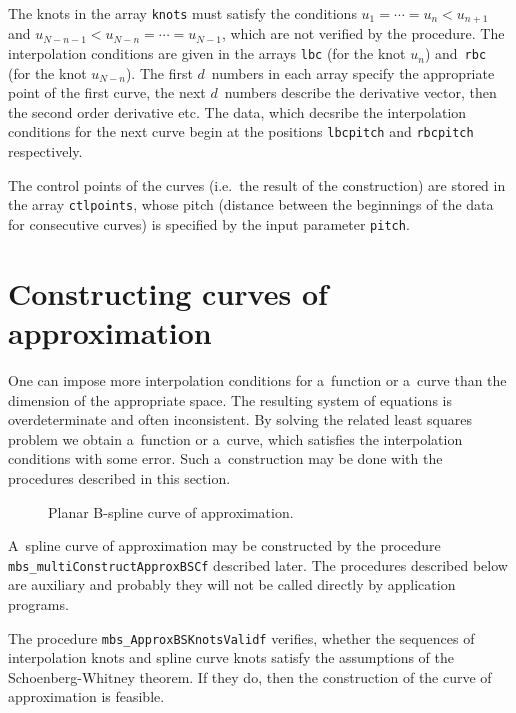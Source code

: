 The knots in the array \texttt{knots} must satisfy the conditions
$u_1=\cdots=u_n<u_{n+1}$ and $u_{N-n-1}<u_{N-n}=\cdots=u_{N-1}$,
which are not verified by the procedure. The interpolation conditions
are given in the arrays \texttt{lbc} (for the knot $u_n$) and~\texttt{rbc}
(for the knot $u_{N-n}$). The first $d$~numbers in each array specify
the appropriate point of the first curve, the next $d$~numbers describe the
derivative vector, then the second order derivative etc.
The data, which decsribe the interpolation conditions for the next curve
begin at the positions \texttt{lbcpitch} and \texttt{rbcpitch} respectively.

The control points of the curves (i.e.\ the result of the construction)
are stored in the array \texttt{ctlpoints}, whose pitch
(distance between the beginnings of the data for consecutive curves)
is specified by the input parameter \texttt{pitch}.


\newpage
\section{Constructing curves of approximation}

\begin{sloppypar}
One can impose more interpolation conditions for a~function or a~curve
than the dimension of the appropriate space. The resulting system of equations
is overdeterminate and often inconsistent. By solving the related least squares
problem we obtain a~function or a~curve, which satisfies the interpolation
conditions with some error. Such a~construction may be done with
the procedures described in this section.
\end{sloppypar}

\begin{figure}[ht]
  \centerline{}
  \caption{Planar B-spline curve of approximation.}
\end{figure}
\begin{sloppypar}
A~spline curve of approximation may be constructed by the procedure \\
\texttt{mbs\_multiConstructApproxBSCf} described later. The procedures
described below are auxiliary and probably they will not be called
directly by application programs.
\end{sloppypar}

\vspace{\bigskipamount}
\begin{sloppypar}
The procedure \texttt{mbs\_ApproxBSKnotsValidf} verifies, whether the sequences
of interpolation knots and spline curve knots satisfy the assumptions of the
Schoenberg-Whitney theorem. If they do, then the construction of
the curve of approximation is feasible.
\end{sloppypar}

